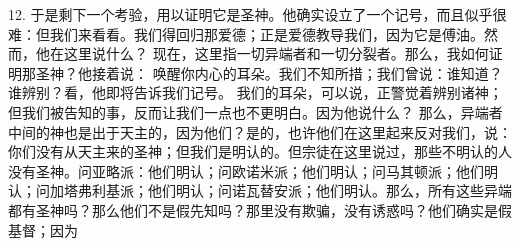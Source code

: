 12. 于是剩下一个考验，用以证明它是圣神。他确实设立了一个记号，而且似乎很难：但我们来看看。我们得回归那爱德；正是爱德教导我们，因为它是傅油。然而，他在这里说什么？ 现在，这里指一切异端者和一切分裂者。那么，我如何证明那圣神？他接着说： 唤醒你内心的耳朵。我们不知所措；我们曾说：谁知道？谁辨别？看，他即将告诉我们记号。 我们的耳朵，可以说，正警觉着辨别诸神；但我们被告知的事，反而让我们一点也不更明白。因为他说什么？ 那么，异端者中间的神也是出于天主的，因为他们？是的，也许他们在这里起来反对我们，说：你们没有从天主来的圣神；但我们是明认的。但宗徒在这里说过，那些不明认的人没有圣神。问亚略派：他们明认；问欧诺米派；他们明认；问马其顿派；他们明认；问加塔弗利基派；他们明认；问诺瓦替安派；他们明认。那么，所有这些异端都有圣神吗？那么他们不是假先知吗？那里没有欺骗，没有诱惑吗？他们确实是假基督；因为\par

